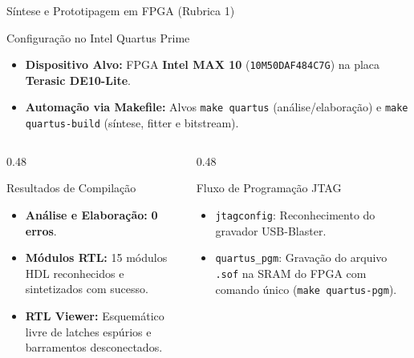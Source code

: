 \documentclass[aspectratio=169, 11pt]{beamer}
\begin{document}
\begin{frame}{Síntese e Prototipagem em FPGA (Rubrica 1)}
  \begin{block}{Configuração no Intel Quartus Prime}
    \begin{itemize}
      \item \textbf{Dispositivo Alvo:} FPGA \textbf{Intel MAX 10} (\texttt{10M50DAF484C7G}) na placa \textbf{Terasic DE10-Lite}.
      \item \textbf{Automação via Makefile:} Alvos \texttt{make quartus} (análise/elaboração) e \texttt{make quartus-build} (síntese, fitter e bitstream).
    \end{itemize}
  \end{block}

  \vspace{0.3cm}
  \begin{columns}[T]
    \begin{column}{0.48\textwidth}
      \begin{exampleblock}{Resultados de Compilação}
        \begin{itemize}\setlength{\itemsep}{4pt}
          \item \textbf{Análise e Elaboração:} \textbf{0 erros}.
          \item \textbf{Módulos RTL:} 15 módulos HDL reconhecidos e sintetizados com sucesso.
          \item \textbf{RTL Viewer:} Esquemático livre de latches espúrios e barramentos desconectados.
        \end{itemize}
      \end{exampleblock}
    \end{column}

    \begin{column}{0.48\textwidth}
      \begin{exampleblock}{Fluxo de Programação JTAG}
        \begin{itemize}\setlength{\itemsep}{4pt}
          \item \texttt{jtagconfig}: Reconhecimento do gravador USB-Blaster.
          \item \texttt{quartus\_pgm}: Gravação do arquivo \texttt{.sof} na SRAM do FPGA com comando único (\texttt{make quartus-pgm}).
        \end{itemize}
      \end{exampleblock}
    \end{column}
  \end{columns}
\end{frame}
\end{document}
